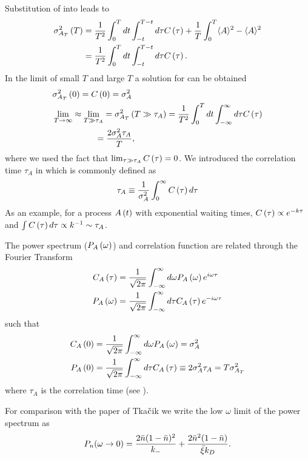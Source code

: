 Substitution of  into  leads to
\begin{align}
\sigma^2_{A_T}\br{T}&=\frac{1}{T^2}\int_0^T dt \int_{-t}^{T-t} d\tau C\br{\tau}+\frac{1}{T}\int_0^T \avg{A}^2-\avg{A}^2\\
\elabel{si:time_av_var4}
&=\frac{1}{T^2}\int_0^T dt \int_{-t}^{T-t} d\tau C\br{\tau}.
\end{align}
In the limit of small $T$ and large $T$ a solution for  can be obtained
\begin{align}
\elabel{si:limT_0_corr}
&\sigma^2_{A_T}\br{0}=C\br{0}=\sigma_A^2\\
\elabel{si:limT_infty_corr}
&\lim_{T\to\infty}\approx \lim_{T\gg \tau_A}=\sigma^2_{A_T}\br{T\gg \tau_A}=\frac{1}{T^2}\int_0^T dt \int_{-\infty}^{\infty} d\tau
C\br{\tau}\nonumber\\
&\quad\qquad\qquad=\frac{2\sigma_A^2\tau_A}{T},
\end{align}
where we used the fact that $\lim_{\tau\gg\tau_A} C\left ( \tau\right )=0$. We introduced the correlation time $\tau_A$ in 
which is commonly defined as
\begin{align}
\elabel{si:corr_time}
\tau_A\equiv \frac{1}{\sigma^2_A}\int_0^\infty C\br{\tau} d\tau
\end{align}
As an example, for a process $A\left ( t\right )$ with exponential waiting times, $C\left ( \tau\right )\propto e^{-k \tau}$ and $\int C\left ( \tau\right )d\tau \propto
k^{-1} \sim \tau_A$.

The power spectrum ($P_A\left ( \omega\right )$) and correlation function are related through the Fourier Transform
\begin{align}
\elabel{si:rel_pow_lap}
C_A\br{\tau}&=\frac{1}{\sqrt{2\pi}}\int_{-\infty}^\infty d\omega P_A\br{\omega}e^{i\omega\tau}\\
P_A\br{\omega}&=\frac{1}{\sqrt{2\pi}}\int_{-\infty}^\infty d\tau C_A\br{\tau}e^{-i\omega\tau}
\end{align}
such that
\begin{align}
C_A\left ( 0\right )&=\frac{1}{\sqrt{2\pi}}\int_{-\infty}^\infty d\omega P_A\left ( \omega\right )=\sigma_A^2\\
P_A\left ( 0\right )&=\frac{1}{\sqrt{2\pi}}\int_{-\infty}^\infty d\tau C_A\left ( \tau\right )\equiv 2\sigma_A^2\tau_A=T\sigma^2_{A_T}
\end{align}
where $\tau_A$ is the correlation time (see ).

For comparison with the paper of Tka$\check{\rm c}$ik \cite{Tkacik2009} we write the low $\omega$ limit of the power spectrum as
\begin{equation}
 P_n(\omega \to 0) = \frac{2 \bar{n}(1-\bar{n})^2}{k_-} + \frac{2\bar{n}^2(1-\bar{n})}{\bar{\xi} k_D}.
 \elabel{Sn}
\end{equation}


